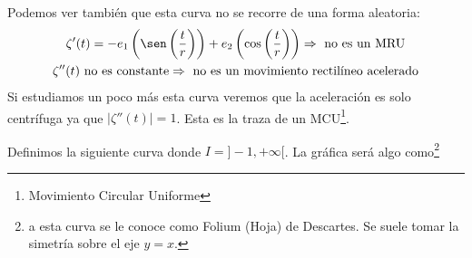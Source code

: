 \begin{ejemplo}
    Podemos ver también que esta curva no se recorre de una forma aleatoria:
    \begin{gather*}
        \zeta'(t) = -e_1\left(\sen\left(\frac{t}{r}\right)\right) + e_2\left(\cos\left(\frac{t}{r}\right)\right) \Rightarrow \text{ no es un MRU}\\
        \zeta''(t) \text{ no es constante} \Rightarrow \text{ no es un movimiento rectilíneo acelerado}
    \end{gather*}
    Si estudiamos un poco más esta curva veremos que la aceleración es solo centrífuga ya que $|\zeta''(t)|=1$. Esta es la traza de un MCU\footnote{Movimiento Circular Uniforme}.
\end{ejemplo}

\begin{ejemplo}
    Definimos la siguiente curva
    donde $I=]-1, +\infty[$. La gráfica será algo como\footnote{a esta curva se le conoce como Folium (Hoja) de Descartes. Se suele tomar la simetría sobre el eje $y=x$.}

    \begin{center}
\end{center}
\end{ejemplo}
